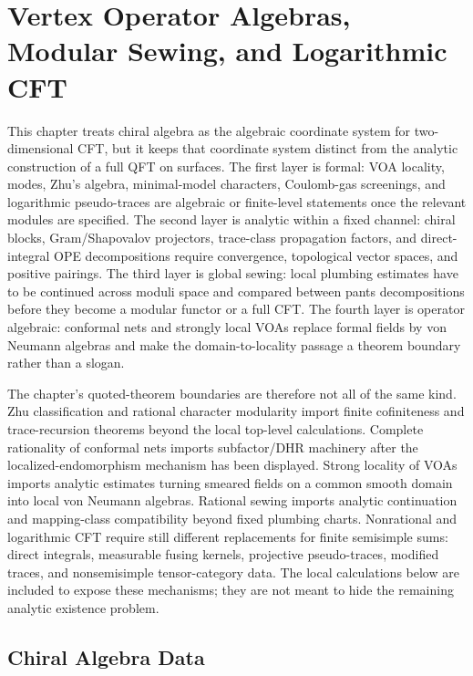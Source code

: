 \chapter{Vertex Operator Algebras, Modular Sewing, and Logarithmic CFT}
\label{ch:voa-modular-sewing-logarithmic-cft}

\ConventionsEuclidean

This chapter treats chiral algebra as the algebraic coordinate system for
two-dimensional CFT, but it keeps that coordinate system distinct from the
analytic construction of a full QFT on surfaces.  The first layer is formal:
VOA locality, modes, Zhu's algebra, minimal-model characters, Coulomb-gas
screenings, and logarithmic pseudo-traces are algebraic or finite-level
statements once the relevant modules are specified.  The second layer is
analytic within a fixed channel: chiral blocks, Gram/Shapovalov projectors,
trace-class propagation factors, and direct-integral OPE decompositions
require convergence, topological vector spaces, and positive pairings.  The
third layer is global sewing: local plumbing estimates have to be continued
across moduli space and compared between pants decompositions before they
become a modular functor or a full CFT.  The fourth layer is operator
algebraic: conformal nets and strongly local VOAs replace formal fields by
von Neumann algebras and make the domain-to-locality passage a theorem
boundary rather than a slogan.

The chapter's quoted-theorem boundaries are therefore not all of the same
kind.  Zhu classification and rational character modularity import finite
cofiniteness and trace-recursion theorems beyond the local top-level
calculations.  Complete rationality of conformal nets imports subfactor/DHR
machinery after the localized-endomorphism mechanism has been displayed.
Strong locality of VOAs imports analytic estimates turning smeared fields on a
common smooth domain into local von Neumann algebras.  Rational sewing imports
analytic continuation and mapping-class compatibility beyond fixed plumbing
charts.  Nonrational and logarithmic CFT require still different replacements
for finite semisimple sums: direct integrals, measurable fusing kernels,
projective pseudo-traces, modified traces, and nonsemisimple tensor-category
data.  The local calculations below are included to expose these mechanisms;
they are not meant to hide the remaining analytic existence problem.

\section{Chiral Algebra Data}

